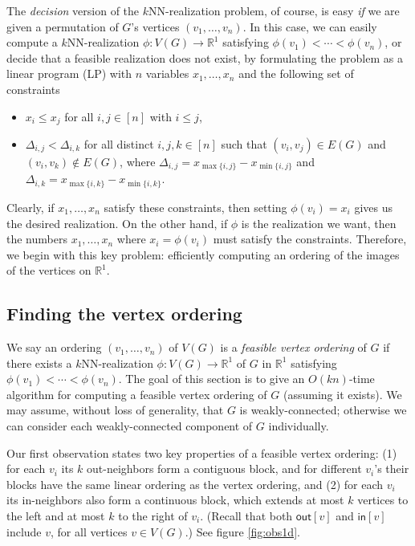 \documentclass[11pt]{article}
\begin{document}
The \emph{decision} version of the $k$NN-realization problem, of course, is easy \emph{if} we are given a permutation of $G$'s vertices $(v_1,\dots,v_n)$. In this case, we can easily compute a $k$NN-realization $\phi: V(G) \rightarrow \mathbb{R}^1$ satisfying $\phi(v_1) < \cdots < \phi(v_n)$, or decide that a feasible realization does not exist, by formulating the  problem as a linear program (LP) with $n$ variables $x_1,\dots,x_n$ and the following set of constraints
\begin{itemize}
    \item $x_i \leq x_j$ for all $i,j \in [n]$ with $i \leq j$,
    \item $\Delta_{i,j} < \Delta_{i,k}$ for all distinct $i,j,k \in [n]$ such that $(v_i,v_j) \in E(G)$ and $(v_i,v_k) \notin E(G)$, where $\Delta_{i,j} = x_{\max\{i,j\}} - x_{\min\{i,j\}}$ and $\Delta_{i,k} = x_{\max\{i,k\}} - x_{\min\{i,k\}}$.
\end{itemize}
%
Clearly, if $x_1,\dots,x_n$ satisfy these constraints, then setting $\phi(v_i) = x_i$ gives us the desired realization.
On the other hand, if $\phi$ is the realization we want, then the numbers $x_1,\dots,x_n$ where $x_i = \phi(v_i)$ must satisfy the constraints.
Therefore, we begin with this key problem: efficiently computing an ordering of the images of the vertices on $\mathbb{R}^1$.

\subsection{Finding the vertex ordering}

We say an ordering $(v_1,\dots,v_n)$ of $V(G)$ is a \textit{feasible vertex ordering} of $G$ if there exists a $k$NN-realization $\phi: V(G) \rightarrow \mathbb{R}^1$ of $G$ in $\mathbb{R}^1$ satisfying $\phi(v_1) < \cdots < \phi(v_n)$.
The goal of this section is to give an $O(kn)$-time algorithm for computing a feasible vertex ordering of $G$ (assuming it exists).
We may assume, without loss of generality, that $G$ is weakly-connected; otherwise we can consider each weakly-connected component of $G$ individually. 

Our first observation states two key properties of a feasible vertex ordering: (1) for each $v_i$ its $k$ out-neighbors form a contiguous block, and for different $v_i$'s their blocks have the same linear ordering as the vertex ordering, and (2) for each $v_i$ its in-neighbors also form a continuous block, which extends at most $k$ vertices to the left and at most $k$ to the right of $v_i$. (Recall that both $\mathsf{out}[v]$ and $\mathsf{in}[v]$ include $v$, for all vertices $v \in V(G)$.) See figure \ref{fig:obs1d}.
\end{document}
